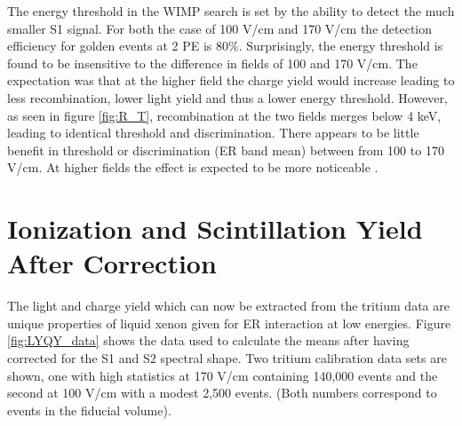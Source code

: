 The energy threshold  in the WIMP search is set by the ability to detect the much smaller S1 signal. For both the case of 100 V/cm and 170 V/cm the  detection efficiency for golden events at 2 PE is 80\%. Surprisingly, the energy threshold is found to be insensitive to the difference in fields of 100 and 170 V/cm. The expectation was that at the higher field the charge yield would increase leading to less recombination, lower light yield and thus a lower energy threshold. However, as seen in figure \ref{fig:R_T}, recombination at the two fields merges below 4 keV, leading to identical threshold and discrimination. There appears to be little benefit in threshold or discrimination (ER band mean) between from 100 to 170 V/cm. At higher fields the effect is expected to be more noticeable \cite{NEST_2013}.

\newpage

\section{Ionization and Scintillation Yield After Correction}

The light and charge yield which can now be extracted from the tritium data are unique properties of liquid xenon given for ER interaction at low energies. Figure \ref{fig:LYQY_data} shows the data used to calculate the means after having corrected for the S1 and S2 spectral shape. Two tritium calibration data sets are shown, one with high statistics at 170 V/cm containing 140,000 events and the second at 100 V/cm with a modest 2,500 events. (Both numbers correspond to events in the fiducial volume).
 
 

